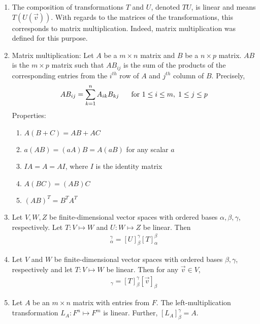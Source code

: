 \documentclass[10pt]{article}
\begin{document}
\begin{multicols*}{2}
\begin{enumerate}
\begin{enumerate}
        \item The composition of transformations $T$ and $U$, denoted $TU$, is linear and means $T(U(\vec{v}))$. With regards to the matrices of the transformations, this corresponds to matrix multiplication. Indeed, matrix multiplication was defined for this purpose.
        
        \item Matrix multiplication: Let $A$ be a $m \times n$ matrix and $B$ be a $n \times p$ matrix. $AB$ is the $m \times p$ matrix such that $AB_{ij}$ is the sum of the products of the corresponding entries from the $i^{th}$ row of $A$ and $j^{th}$ column of $B$. Precisely,
        \begin{align*}
            AB_{ij} = \sum_{k=1}^{n} A_{ik} B_{kj} \hspace{6mm} \text{for } 1 \leq i \leq m, \hspace{1mm} 1 \leq j \leq p 
        \end{align*}
        Properties:
        \begin{enumerate}
            \item $A(B + C) = AB + AC$
            \item $a(AB) = (aA)B = A(aB)$ for any scalar $a$
            \item $IA = A = AI$, where $I$ is the identity matrix
            \item $A(BC) = (AB)C$
            \item $(AB)^T = B^TA^T$
        \end{enumerate}
        
        \item Let $V,W,Z$ be finite-dimensional vector spaces with ordered bases $\alpha,\beta,\gamma$, respectively. Let $T: V \mapsto W$ and $U: W \mapsto Z$ be linear. Then
        \begin{align*}
            [UT]_\alpha^\gamma = [U]_\beta^\gamma[T]_\alpha^\beta
        \end{align*}
        
        \item Let $V$ and $W$ be finite-dimensional vector spaces with ordered bases $\beta,\gamma$, respectively and let $T: V \mapsto W$ be linear. Then for any $\vec{v} \in V$, 
        \begin{align*}
            [T(\vec{v})]_\gamma = [T]_\beta^\gamma[\vec{v}]_\beta
        \end{align*}
        
        \item Let $A$ be an $m \times n$ matrix with entries from $F$. The left-multiplication transformation $L_A: F^n \mapsto F^m$ is linear. Further, $[L_A]_\beta^\gamma = A$.
        

\end{enumerate}
\end{enumerate}
\end{multicols*}
\end{document}

